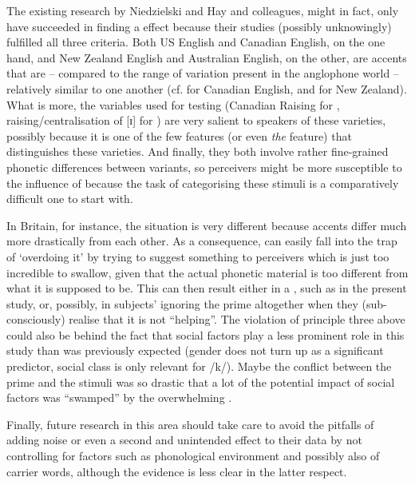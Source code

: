 The existing research by Niedzielski and Hay and colleagues, might in fact, only have succeeded in finding a  effect because their studies (possibly unknowingly) fulfilled all three criteria.
Both US English and Canadian English, on the one hand, and New Zealand English and Australian English, on the other, are accents that are -- compared to the range of variation present in the anglophone world -- relatively similar to one another (cf. \citealt[31]{halford2002} for Canadian English, and \citealt[354]{hayetal2006a} for New Zealand).
What is more, the variables used for testing (Canadian Raising for \citealt{niedzielski1999}, raising/centralisation of [ɪ] for \citealt{hayetal2006a,haydrager2010}) are very salient to speakers of these varieties, possibly because it is one of the few features (or even \emph{the} feature) that distinguishes these varieties.
And finally, they both involve rather fine-grained phonetic differences between variants, so perceivers might be more susceptible to the influence of  because the task of categorising these stimuli is a comparatively difficult one to start with.

In Britain, for instance, the situation is very different because accents differ much more drastically from each other.
As a consequence,  can easily fall into the trap of `overdoing it' by trying to suggest something to perceivers which is just too incredible to swallow, given that the actual phonetic material is too different from what it is supposed to be.
This can then result either in a , such as in the present study, or, possibly, in subjects' ignoring the prime altogether \parencite[like in][]{lawrence2015} when they (sub-consciously) realise that it is not ``helping''.
The violation of principle three above could also be behind the fact that social factors play a less prominent role in this study than was previously expected (gender does not turn up as a significant predictor, social class is only relevant for /k/).
Maybe the conflict between the prime and the stimuli was so drastic that a lot of the potential impact of social factors was ``swamped'' by the overwhelming .

Finally, future research in this area should take care to avoid the pitfalls of adding noise or even a second and unintended  effect to their data by not controlling for factors such as phonological environment and possibly also  of carrier words, although the evidence is less clear in the latter respect.

